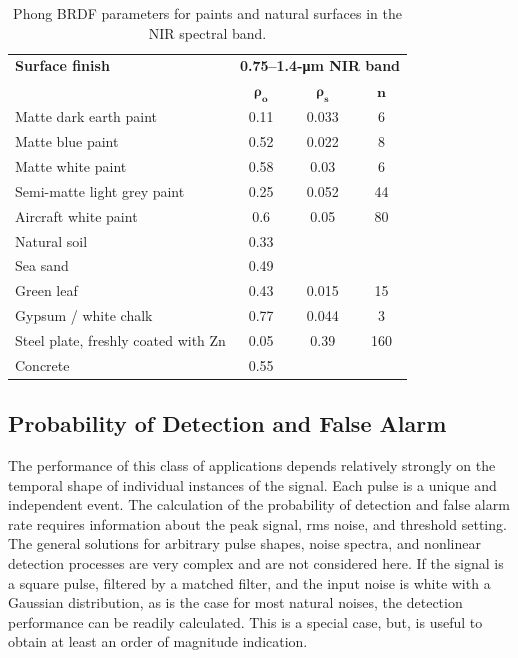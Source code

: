\begin{table}[t]
\centering
\caption{Phong BRDF parameters for paints and natural surfaces in the NIR spectral band.\label{brdftab}}
{\small
\begin{tabular}{|l|c|c|c|}
\hline
\textbf{Surface finish} &\multicolumn{3}{c|}{\textbf{0.75--1.4-\si{\micro\metre}{} NIR band}} \\
\cline{2-4}
 & $\bm{ \rho_o}$& $\bm{\rho_s}$ & $\bm{n}$ \\
\hline
Matte dark earth paint & 0.11 & 0.033 & 6\\
Matte blue paint & 0.52 & 0.022 & 8\\
Matte white paint & 0.58 & 0.03 & 6\\
Semi-matte light grey paint & 0.25 & 0.052 & 44\\
Aircraft white paint & 0.6 & 0.05 & 80 \\
\hline
Natural soil & 0.33 & & \\
Sea sand & 0.49 && \\
Green leaf & 0.43 & 0.015 & 15\\
Gypsum / white chalk & 0.77 & 0.044 & 3\\
Steel plate, freshly coated with Zn& 0.05 & 0.39 & 160\\
Concrete & 0.55 & & \\
\hline
\end{tabular}
}
\end{table}


\afterpage{\clearpage}


\subsection{Probability of Detection and False Alarm}

The performance of this class of applications depends relatively strongly on the temporal shape of individual instances of the signal. Each pulse is a unique and independent event. 
The calculation of  the probability of detection and false alarm rate requires information about the peak signal, rms noise, and threshold setting. The general  solutions for arbitrary pulse shapes, noise spectra, and nonlinear detection processes are very complex and are not considered here. If the signal is a square pulse, filtered by a matched filter, and the input noise is white with a Gaussian distribution, as is the case for most natural noises, the detection performance can be readily calculated. This is a special case, but, is useful to obtain at least an order of magnitude indication. 

